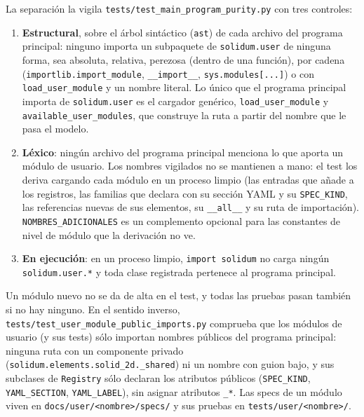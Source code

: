 \documentclass[11pt,oneside]{report}
\begin{document}
La separación la vigila \texttt{tests/\allowbreak{}test\_\allowbreak{}main\_\allowbreak{}program\_\allowbreak{}purity.\allowbreak{}py} con tres controles:

\begin{enumerate}
  \item \textbf{Estructural}, sobre el árbol sintáctico (\texttt{ast}) de cada archivo del programa principal: ninguno importa un subpaquete de \texttt{solidum.user} de ninguna forma, sea absoluta, relativa, perezosa (dentro de una función), por cadena (\texttt{importlib.\allowbreak{}import\_\allowbreak{}module}, \texttt{\_\_import\_\_}, \texttt{sys.modules[...]}) o con \texttt{load\_user\_module} y un nombre literal. Lo único que el programa principal importa de \texttt{solidum.user} es el cargador genérico, \texttt{load\_user\_module} y \texttt{available\_\allowbreak{}user\_\allowbreak{}modules}, que construye la ruta a partir del nombre que le pasa el modelo.
  \item \textbf{Léxico}: ningún archivo del programa principal menciona lo que aporta un módulo de usuario. Los nombres vigilados no se mantienen a mano: el test los deriva cargando cada módulo en un proceso limpio (las entradas que añade a los registros, las familias que declara con su sección YAML y su \texttt{SPEC\_KIND}, las referencias nuevas de sus elementos, su \texttt{\_\_all\_\_} y su ruta de importación). \texttt{NOMBRES\_\allowbreak{}ADICIONALES} es un complemento opcional para las constantes de nivel de módulo que la derivación no ve.
  \item \textbf{En ejecución}: en un proceso limpio, \texttt{import solidum} no carga ningún \texttt{solidum.user.*} y toda clase registrada pertenece al programa principal.
\end{enumerate}

Un módulo nuevo no se da de alta en el test, y todas las pruebas pasan también si no hay ninguno. En el sentido inverso, \texttt{tests/\allowbreak{}test\_\allowbreak{}user\_\allowbreak{}module\_\allowbreak{}public\_\allowbreak{}imports.\allowbreak{}py} comprueba que los módulos de usuario (y sus tests) sólo importan nombres públicos del programa principal: ninguna ruta con un componente privado (\texttt{solidum.\allowbreak{}elements.\allowbreak{}solid\_\allowbreak{}2d.\allowbreak{}\_\allowbreak{}shared}) ni un nombre con guion bajo, y sus subclases de \texttt{Registry} sólo declaran los atributos públicos (\texttt{SPEC\_KIND}, \texttt{YAML\_SECTION}, \texttt{YAML\_LABEL}), sin asignar atributos \texttt{\_*}. Las specs de un módulo viven en \texttt{docs/\allowbreak{}user/\allowbreak{}\textless{}nombre\textgreater{}/\allowbreak{}specs/\allowbreak{}} y sus pruebas en \texttt{tests/\allowbreak{}user/\allowbreak{}\textless{}nombre\textgreater{}/\allowbreak{}}.
\end{document}
